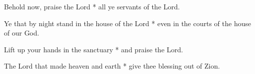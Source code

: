 Behold now, praise the Lord * all ye servants of the Lord.

Ye that by night stand in the house of the Lord * even in the courts of the house of our God.

Lift up your hands in the sanctuary * and praise the Lord.

The Lord that made heaven and earth * give thee blessing out of Zion.